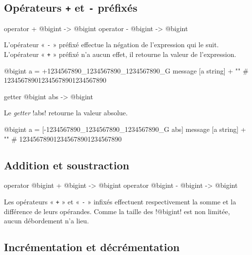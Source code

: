 \subsection{Opérateurs \texttt{+} et \texttt{-} préfixés}

\begin{galgasbox}
operator + @bigint -> @bigint
operator - @bigint -> @bigint
\end{galgasbox}

L'opérateur « \texttt{-} » préfixé effectue la négation de l'expression qui le suit. L'opérateur « \texttt{+} » préfixé n'a aucun effet, il retourne la valeur de l'expression.

\begin{galgas}
@bigint a = +1234567890_1234567890_1234567890_G
message [a string] + "\n" # 123456789012345678901234567890
\end{galgas}










\begin{galgasbox}
getter @bigint abs -> @bigint
\end{galgasbox}

Le \emph{getter} \ggs!abs! retourne la valeur absolue.

\begin{galgas}
@bigint a = [-1234567890_1234567890_1234567890_G abs]
message [a string] + "\n" # 123456789012345678901234567890
\end{galgas}






\subsection{Addition et soustraction}

\begin{galgasbox}
operator @bigint + @bigint -> @bigint
operator @bigint - @bigint -> @bigint
\end{galgasbox}

Les opérateurs « \texttt{+} » et « \texttt{-} » infixés effectuent respectivement la somme et la différence de leurs opérandes. Comme la taille des \ggs!@bigint! est non limitée, aucun débordement n'a lieu.


\subsection{Incrémentation et décrémentation}


